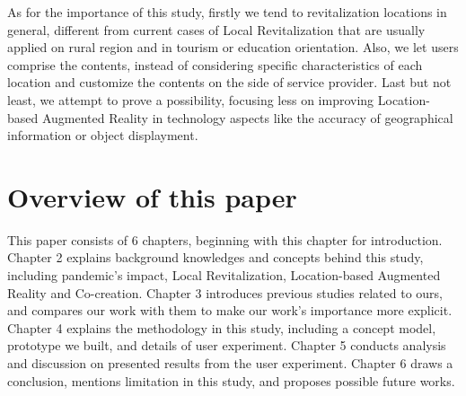 
As for the importance of this study, firstly we tend to revitalization locations in general, different from current cases of Local Revitalization that are usually applied on rural region and in tourism or education orientation.
Also, we let users comprise the contents, instead of considering specific characteristics of each location and customize the contents on the side of service provider.
Last but not least, we attempt to prove a possibility, focusing less on improving Location-based Augmented Reality in technology aspects like the accuracy of geographical information or object displayment.

\section{Overview of this paper}
This paper consists of 6 chapters, beginning with this chapter for introduction.
Chapter 2 explains background knowledges and concepts behind this study, including pandemic's impact, Local Revitalization, Location-based Augmented Reality and Co-creation.
Chapter 3 introduces previous studies related to ours, and compares our work with them to make our work's importance more explicit.
Chapter 4 explains the methodology in this study, including a concept model, prototype we built, and details of user experiment.
Chapter 5 conducts analysis and discussion on presented results from the user experiment.
Chapter 6 draws a conclusion, mentions limitation in this study, and proposes possible future works.
